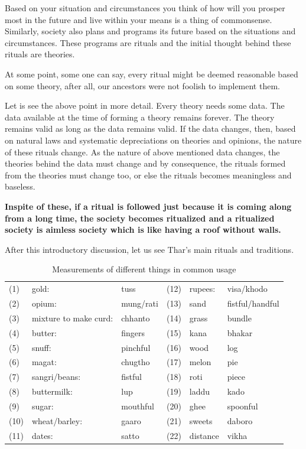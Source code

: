 Based on your situation and circumstances you think of how will you prosper most
in the future and live within your means is a thing of commonsense. Similarly,
society also plans and programs its future based on the situations and
circumstances. These programs are rituals and the initial thought behind these
rituals are theories.

At some point, some one can say, every ritual might be deemed reasonable based
on some theory, after all, our ancestors were not foolish to implement them.

Let is see the above point in more detail. Every theory needs some data. The
data available at the time of forming a theory remains forever. The theory
remains valid as long as the data remains valid. If the data changes, then,
based on natural laws and systematic depreciations on theories and opinions, the
nature of these rituals change. As the nature of above mentioned data changes,
the theories behind the data must change and by consequence, the rituals formed
from  the theories must change too, or else the rituals becomes meaningless and
baseless.

\textbf{Inspite of these, if a ritual is followed just because it is coming along from a
long time, the society becomes ritualized and a ritualized society is aimless
society which is like having a roof without walls.}

After this introductory discussion, let us see Thar's main rituals and
traditions.

\begin{table}
\begin{center}
\begin{tabular}{|lll|lll|}
\hline
(1) & gold: & tuss & (12) & rupees: & visa/khodo\\
(2) & opium: & mung/rati & (13)  &sand  & fistful/handful\\
(3) &mixture to make curd: & chhanto & (14)  &grass  &bundle\\
(4) &butter: & fingers & (15) &kana  &bhakar\\
(5) &snuff: &pinchful & (16) &wood  &log\\
(6) &magat: &chugtho & (17) &melon  & pie\\
(7) &sangri/beans: &fistful & (18) &roti  & piece\\
(8) &buttermilk: &lup & (19) &laddu  &kado\\
(9) &sugar: &mouthful & (20) &ghee  & spoonful\\
(10)&wheat/barley: &gaaro & (21) &sweets  & daboro\\
(11)&dates: &satto & (22) &distance  & vikha\\
\hline
\end{tabular}
\end{center}
\caption{Measurements of different things in common usage}
\label{tbl:measure}
\end{table}

